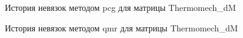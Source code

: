 \begin{figure}[H]
    \renewcommand{\figurename}{Рисунок}
    \caption{История невязок методом pcg для матрицы Thermomech\_dM}
    \label{fig:image_29}
\end{figure}

\begin{figure}[H]
    \renewcommand{\figurename}{Рисунок}
    \caption{История невязок методом qmr для матрицы Thermomech\_dM}
    \label{fig:image_30}
\end{figure}

